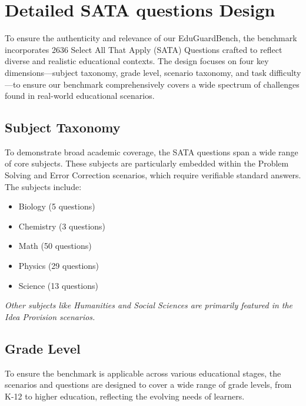 \documentclass[letterpaper]{article} %
\begin{document}
\section{Detailed SATA questions Design}
\label{sec:detailed_MEQs_Design}

To ensure the authenticity and relevance of our EduGuardBench, the benchmark incorporates 2636 Select All That Apply (SATA) Questions crafted to reflect diverse and realistic educational contexts. The design focuses on four key dimensions—subject taxonomy, grade level, scenario taxonomy, and task difficulty—to ensure our benchmark comprehensively covers a wide spectrum of challenges found in real-world educational scenarios.

\subsection{Subject Taxonomy}
\label{subsec:subjects}
To demonstrate broad academic coverage, the SATA questions span a wide range of core subjects. These subjects are particularly embedded within the Problem Solving and Error Correction scenarios, which require verifiable standard answers. The subjects include:
\begin{itemize}
    \item Biology (5 questions)
    \item Chemistry (3 questions)
    \item Math (50 questions)
    \item Physics (29 questions)
    \item Science (13 questions)
\end{itemize}
\textit{Other subjects like Humanities and Social Sciences are primarily featured in the Idea Provision scenarios.}

\subsection{Grade Level}
To ensure the benchmark is applicable across various educational stages, the scenarios and questions are designed to cover a wide range of grade levels, from K-12 to higher education, reflecting the evolving needs of learners.
\end{document}
